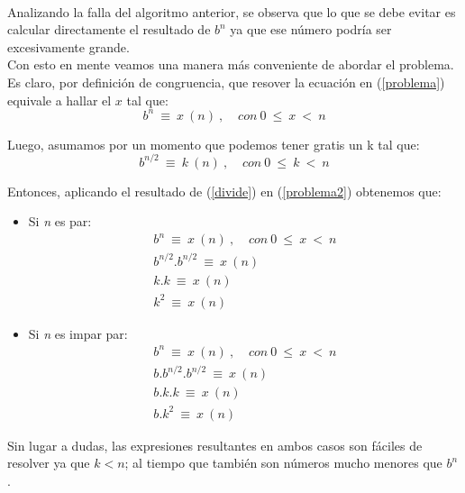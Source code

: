 \paragraph{}
Analizando la falla del algoritmo anterior, se observa que lo que se debe evitar es calcular directamente el resultado de $b^n$ ya que ese número podría ser excesivamente grande. \\
Con esto en mente veamos una manera más conveniente de abordar el problema. Es claro, por definición de congruencia, que resover la ecuación en (\ref{problema}) equivale a hallar el $x$ tal que:
	\begin{equation}
		b^n\ \equiv\ x\ (n)\ , \hspace{10pt}\ con\ 0\ \leq\ x\ <\ n 
	\label{problema2}
	\end{equation}

Luego, asumamos por un momento que podemos tener gratis un k tal que:
	\begin{equation}
		b^{n/2}\ \equiv\ k\ (n)\ , \hspace{10pt}\ con\ 0\ \leq\ k\ <\ n 
	\label{divide}
	\end{equation}

Entonces, aplicando el resultado de (\ref{divide}) en (\ref{problema2}) obtenemos que:
	\begin{itemize}
		\item{
		Si \textit{n} es par:
			\begin{eqnarray}
				b^n\ \equiv\ x\ (n)\ , \hspace{10pt}\ con\ 0\ \leq\ x\ <\ n \nonumber\\
				b^{n/2}.b^{n/2}\ \equiv\ x\ (n) \nonumber\\
				k.k\ \equiv\ x\ (n) \nonumber\\
				k^2\ \equiv\ x\ (n)
			\end{eqnarray}
		}
		
		\item{
		Si \textit{n} es impar par:
			\begin{eqnarray}
				b^n\ \equiv\ x\ (n)\ , \hspace{10pt}\ con\ 0\ \leq\ x\ <\ n \nonumber\\
				b.b^{n/2}.b^{n/2}\ \equiv\ x\ (n) \nonumber\\
				b.k.k\ \equiv\ x\ (n) \nonumber\\
				b.k^2\ \equiv\ x\ (n) 
			\end{eqnarray}
		}
	\end{itemize}
Sin lugar a dudas, las expresiones resultantes en ambos casos son fáciles de resolver ya que $k < n$;  al tiempo que también son números mucho menores que $b^n$. \\

